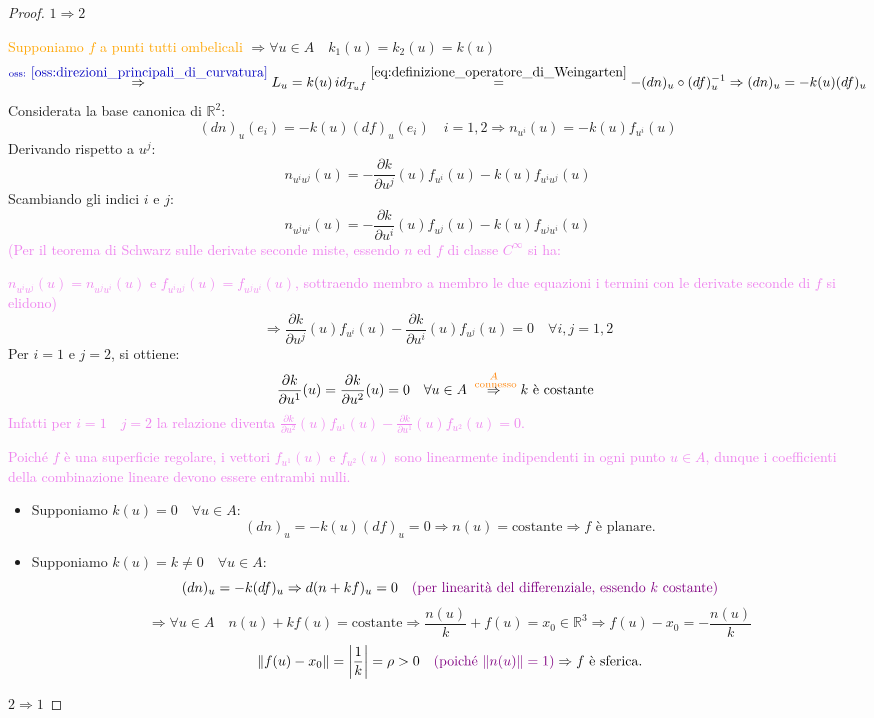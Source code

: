         \begin{proof}
        \mbox{}

        $1 \Rightarrow 2$
        
        \textcolor{orange}{Supponiamo $f$ a punti tutti ombelicali} $ \Rightarrow \forall u \in A \quad k_1(u) = k_2(u) = k(u) $
        \[ \overset{\textcolor{blu}{\text{oss: } \ref{oss:direzioni_principali_di_curvatura}}}{\Rightarrow}  L_u = k(u) \, id_{T_u f} \overset{\eqref{eq:definizione_operatore_di_Weingarten}}{=} -(dn)_u \circ (df)_u^{-1} \Rightarrow (dn)_u = -k(u) (df)_u \]
        Considerata la base canonica di $\mathbb{R}^2$:
        \[ (dn)_u(e_i) = -k(u) (df)_u(e_i) \quad i = 1, 2 \Rightarrow n_{u^i}(u) = -k(u) f_{u^i}(u) \]
        Derivando rispetto a $u^j$:
        \[ n_{u^i u^j}(u) = -\frac{\partial k}{\partial u^j}(u) f_{u^i}(u) - k(u) f_{u^i u^j}(u) \]
        Scambiando gli indici $i$ e $j$:
        \[ n_{u^j u^i}(u) = -\frac{\partial k}{\partial u^i}(u) f_{u^j}(u) - k(u) f_{u^j u^i}(u) \]
        \textcolor{violet}{(Per il teorema di Schwarz sulle derivate seconde miste, essendo $n$ ed $f$ di classe $C^\infty$ si ha:}
        
        \textcolor{violet}{ $n_{u^i u^j}(u) = n_{u^j u^i}(u)$ e $f_{u^i u^j}(u) = f_{u^j u^i}(u)$,
        sottraendo membro a membro le due equazioni i termini con le derivate seconde di $f$ si elidono)}
        \[ \Rightarrow \frac{\partial k}{\partial u^j}(u) f_{u^i}(u) - \frac{\partial k}{\partial u^i}(u) f_{u^j}(u) = 0  \quad \forall i,j=1,2 \]
        Per $i = 1$ e $j = 2$, si ottiene:
        \[ \frac{\partial k}{\partial u^1}(u) = \frac{\partial k}{\partial u^2}(u) = 0 \quad \forall u \in A \overset{\textcolor{orange}{\substack{A \\ \text{ connesso}}}}{\Rightarrow} k \text{ è costante } \]
        \textcolor{violet}{Infatti per $i=1 \quad j=2$ la relazione diventa $\frac{\partial k}{\partial u^2}(u) f_{u^1}(u) - \frac{\partial k}{\partial u^1}(u) f_{u^2}(u) = 0$.}
        
        \textcolor{violet}{Poiché $f$ è una superficie regolare, i vettori $f_{u^1}(u)$ e $f_{u^2}(u)$ sono linearmente indipendenti in ogni punto $u \in A$, dunque i coefficienti della combinazione lineare devono essere entrambi nulli.}
        \begin{itemize}
            \item Supponiamo $k(u) = 0 \quad \forall u \in A$:
            \[ (dn)_u = -k(u)(df)_u = 0 \Rightarrow n(u) = \text{costante} \Rightarrow f \text{ è planare.} \]
            \item Supponiamo $k(u) = k \neq 0 \quad \forall u \in A$:
            \[ (dn)_u = -k(df)_u \Rightarrow d(n + kf)_u = 0 \quad \textcolor{violet}{(\text{per linearità del differenziale, essendo } k \text{ costante})} \]
            \[ \Rightarrow \forall u \in A \quad n(u) + k f(u) = \text{costante} \Rightarrow \frac{n(u)}{k} + f(u) = x_0 \in \mathbb{R}^3 \Rightarrow f(u) - x_0 = -\frac{n(u)}{k} \]
            \[ \norm{f(u) - x_0} = \abs*{\frac{1}{k}} = \rho > 0 \quad \textcolor{violet}{(\text{poiché } \norm{n(u)} = 1)} \Rightarrow f \text{ è sferica.} \]
        \end{itemize}
        $2 \Rightarrow 1$ 
        

\end{proof}
